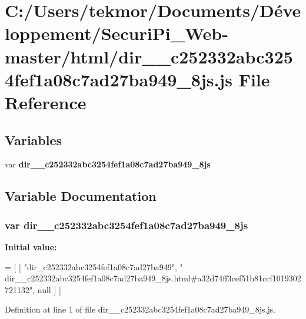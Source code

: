 \section{C\+:/\+Users/tekmor/\+Documents/\+Développement/\+Securi\+Pi\+\_\+\+Web-\/master/html/dir\+\_\+\+\_\+c252332abc3254fef1a08c7ad27ba949\+\_\+8js.js File Reference}
\label{dir____c252332abc3254fef1a08c7ad27ba949__8js_8js}
\subsection*{Variables}
\begin{DoxyCompactItemize}
\item 
var {\bf dir\+\_\+\+\_\+c252332abc3254fef1a08c7ad27ba949\+\_\+8js}
\end{DoxyCompactItemize}


\subsection{Variable Documentation}
\subsubsection[{dir\+\_\+\+\_\+c252332abc3254fef1a08c7ad27ba949\+\_\+8js}]{\setlength{\rightskip}{0pt plus 5cm}var dir\+\_\+\+\_\+c252332abc3254fef1a08c7ad27ba949\+\_\+8js}\label{dir____c252332abc3254fef1a08c7ad27ba949__8js_8js_a7e23a37db93f0dedb25e4c6290c9247d}
{\bfseries Initial value\+:}
\begin{DoxyCode}
=
[
    [ \textcolor{stringliteral}{"dir\_c252332abc3254fef1a08c7ad27ba949"}, \textcolor{stringliteral}{"
      dir\_\_c252332abc3254fef1a08c7ad27ba949\_8js.html#a32d74ff3cef51b81ccf1019302721132"}, null ]
]
\end{DoxyCode}


Definition at line 1 of file dir\+\_\+\+\_\+c252332abc3254fef1a08c7ad27ba949\+\_\+8js.\+js.

